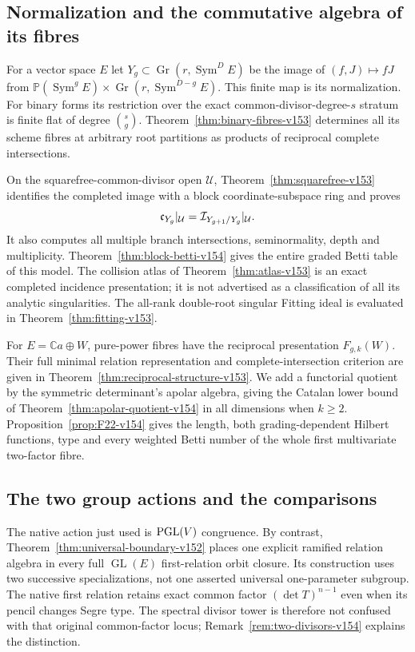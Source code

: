 \documentclass[11pt,reqno]{amsart}
\numberwithin{equation}{section}
\theoremstyle{definition}\newtheorem{definition}[theorem]{Definition}
\theoremstyle{remark}\newtheorem{remark}[theorem]{Remark}
\newcommand{\C}{\mathbb C}\newcommand{\Q}{\mathbb Q}
\newcommand{\Pj}{\mathbb P}\newcommand{\A}{\mathbb A}
\DeclareMathOperator{\Sym}{Sym}\DeclareMathOperator{\Gr}{Gr}
\begin{document}
\subsection{Normalization and the commutative algebra of its fibres}
For a vector space $E$ let $Y_g\subset\Gr(r,\Sym^D E)$ be the
image of $(f,J)\mapsto fJ$ from
$\Pj(\Sym^g E)\times\Gr(r,\Sym^{D-g}E)$. This finite map is its
normalization. For binary forms its restriction over the exact
common-divisor-degree-$s$ stratum is finite flat of degree
$\binom{s}{g}$. Theorem~\ref{thm:binary-fibres-v153} determines
all its scheme fibres at arbitrary root partitions as products
of reciprocal complete intersections.

On the squarefree-common-divisor open $\mathcal U$,
Theorem~\ref{thm:squarefree-v153} identifies the completed image
with a block coordinate-subspace ring and proves
\[
            \mathfrak c_{Y_g}|_{\mathcal U}
                  =\mathcal I_{Y_{g+1}/Y_g}|_{\mathcal U}.
\]
It also computes all multiple branch intersections, seminormality,
depth and multiplicity. Theorem~\ref{thm:block-betti-v154} gives
the entire graded Betti table of this model. The collision atlas
of Theorem~\ref{thm:atlas-v153} is an exact completed incidence
presentation; it is not advertised as a classification of all its
analytic singularities. The all-rank double-root singular Fitting
ideal is evaluated in Theorem~\ref{thm:fitting-v153}.

For $E=\C a\oplus W$, pure-power fibres have the reciprocal
presentation $F_{g,k}(W)$. Their full minimal relation representation
and complete-intersection criterion are given in
Theorem~\ref{thm:reciprocal-structure-v153}. We add a functorial
quotient by the symmetric determinant's apolar algebra, giving the
Catalan lower bound of Theorem~\ref{thm:apolar-quotient-v154} in
all dimensions when $k\geq2$. Proposition~\ref{prop:F22-v154}
gives the length, both grading-dependent Hilbert functions, type
and every weighted Betti number of the whole first multivariate
two-factor fibre.

\subsection{The two group actions and the comparisons}
The native action just used is $\operatorname{PGL}(V)$ congruence. By contrast,
Theorem~\ref{thm:universal-boundary-v152} places one explicit
ramified relation algebra in every full $\operatorname{GL}(E)$
first-relation orbit closure. Its construction uses two successive
specializations, not one asserted universal one-parameter subgroup.
The native first relation retains exact common factor
$(\det T)^{n-1}$ even when its pencil changes Segre type. The
spectral divisor tower is therefore not confused with that original
common-factor locus; Remark~\ref{rem:two-divisors-v154} explains
the distinction.
\end{document}
